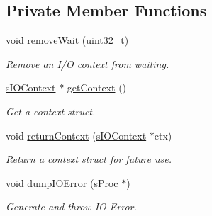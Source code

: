 \subsection*{\-Private \-Member \-Functions}
\begin{DoxyCompactItemize}
\item 
void \hyperlink{classcIOControl_a235b0bd1459463529e1a0b9f07f25ccb}{remove\-Wait} (uint32\-\_\-t)
\begin{DoxyCompactList}\small\item\em \-Remove an \-I/\-O context from waiting. \end{DoxyCompactList}\item 
\hyperlink{structsIOContext}{s\-I\-O\-Context} $\ast$ \hyperlink{classcIOControl_a55df5b64418ea644eb23a6198ff13845}{get\-Context} ()
\begin{DoxyCompactList}\small\item\em \-Get a context struct. \end{DoxyCompactList}\item 
void \hyperlink{classcIOControl_abceaee42b9df46c3fdbd4e26f88e9e88}{return\-Context} (\hyperlink{structsIOContext}{s\-I\-O\-Context} $\ast$ctx)
\begin{DoxyCompactList}\small\item\em \-Return a context struct for future use. \end{DoxyCompactList}\item 
void \hyperlink{classcIOControl_ac0839c4c60b08a2cfa425d3c90d584f3}{dump\-I\-O\-Error} (\hyperlink{structsProc}{s\-Proc} $\ast$)
\begin{DoxyCompactList}\small\item\em \-Generate and throw \-I\-O \-Error. \end{DoxyCompactList}\end{DoxyCompactItemize}
